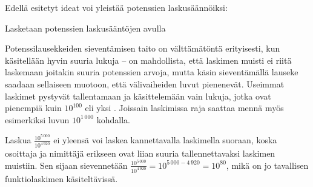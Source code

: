  Edellä esitetyt ideat voi yleistää potenssien laskusäännöiksi:
    
 
    \begin{esimerkki}
        Lasketaan potenssien laskusääntöjen avulla
    \end{esimerkki}
    
 
Potenssilausekkeiden sieventämisen taito on välttämätöntä erityisesti, kun käsitellään hyvin suuria lukuja -- on mahdollista, että laskimen muisti ei riitä laskemaan joitakin suuria potenssien arvoja, mutta käsin sieventämällä lauseke saadaan sellaiseen muotoon, että välivaiheiden luvut pienenevät. Useimmat laskimet pystyvät tallentamaan ja käsittelemään vain lukuja, jotka ovat pienempiä kuin $10^{100}$ eli yksi . Joissain laskimissa raja saattaa mennä myös esimerkiksi luvun $10^{1\,000}$ kohdalla.

\begin{esimerkki}
 Laskua $\frac{10^{5\,000}}{10^{4\,920}}$ ei yleensä voi laskea kannettavalla laskimella suoraan, koska osoittaja ja nimittäjä erikseen ovat liian suuria tallennettavaksi laskimen muistiin. Sen sijaan sievennetään $\frac{10^{5\,000}}{10^{4\,920}}=10^{5\,000-4\,920}=10^{80}$, mikä on jo tavallisen funktiolaskimen käsiteltävissä.
\end{esimerkki}
 
